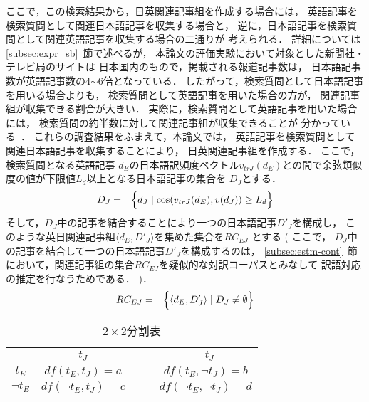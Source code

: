 ここで，この検索結果から，日英関連記事組を作成する場合には，
英語記事を検索質問として関連日本語記事を収集する場合と，
逆に，日本語記事を検索質問として関連英語記事を収集する場合の二通りが
考えられる．
詳細については\ref{subsec:expr_sb}~節で述べるが，
本論文の評価実験において対象とした新聞社・テレビ局のサイトは
日本国内のもので，掲載される報道記事数は，
日本語記事数が英語記事数の4$\sim$6倍となっている．
したがって，検索質問として日本語記事を用いる場合よりも，
検索質問として英語記事を用いた場合の方が，
関連記事組が収集できる割合が大きい．
実際に，検索質問として英語記事を用いた場合には，
検索質問の約半数に対して関連記事組が収集できることが
分かっている~\cite{Horiuchi02aj,Horiuchi02bj}．
これらの調査結果をふまえて，本論文では，
英語記事を検索質問として関連日本語記事を収集することにより，
日英関連記事組を作成する．
ここで，検索質問となる英語記事
$d_E$の日本語訳頻度ベクトル$v_{trJ}(d_E)$との間で余弦類似度の値が下限値$L_d$以上となる日本語記事の集合を
$D_J$とする．
{
\begin{eqnarray*}
D_J & = & \Bigl\{d_J\mid \cos(v_{trJ}(d_E),v(d_J))\geq L_d \Bigr\}
\end{eqnarray*}
}
そして，$D_J$中の記事を結合することにより一つの日本語記事$D'_J$を構成し，
このような英日関連記事組$\langle d_E,D'_J\rangle$を集めた集合を$RC_{EJ}$
とする
(
ここで，
$D_J$中の記事を結合して一つの日本語記事$D'_J$を構成するのは，
\ref{subsec:estm-cont}~節において，関連記事組の集合$RC_{EJ}$を疑似的な対訳コーパスとみなして
訳語対応の推定を行なうためである．
)．
{
\begin{eqnarray}\label{eqn:RCej}
RC_{EJ} & = & \Bigl\{\langle d_E,D'_J\rangle\mid D_J\neq \emptyset\Bigr\}
\end{eqnarray}
}

\begin{table}
\begin{center}
 \caption{$2\times 2$分割表}
 \label{tab:2t2}
{
\begin{center}
\begin{tabular}{c|cccc} \hline
               & $t_J$ & && $\neg t_J$ \\ \hline
$t_E$ &          $df(t_E,t_J)=a$ & && $df(t_E,\neg t_J)=b$  \\
$\neg t_E$    &  $df(\neg t_E,t_J)=c$ & && $df(\neg t_E,\neg t_J)=d$
 \\ \hline
\end{tabular}
\end{center}
}
\end{center}
\end{table}




